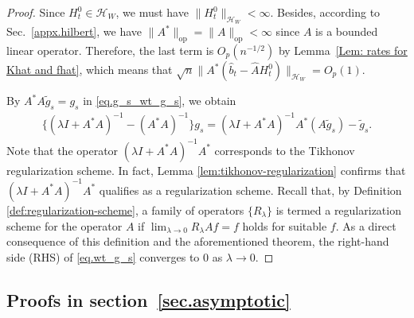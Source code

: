 \documentclass[
  12pt]{article}
\def\to{\rightarrow}
\def\wt{\widetilde}
\def\cH{\mathcal{H}}
\begin{document}
\begin{proof}
Since $H^0_t \in \cH_W$, we must have $\| H^0_t\|_{\cH_W} < \infty$. Besides, according to Sec.~\ref{appx.hilbert}, we have $\| A^*\|_{\mathrm{op}}=\| A\|_{\mathrm{op}} < \infty$ since $A$ is a bounded linear operator. Therefore, the last term is $O_{p}(n^{-1/2})$ by Lemma~\ref{Lem: rates for Khat and fhat}, which means that $\sqrt{n}\| A^*(\widehat{b}_t-\widehat{A}H^0_t)\|_{\mathcal{H}_W}=O_{p}(1)$. 


By $A^*A\wt{g}_s=g_s$ in \eqref{eq.g_s_wt_g_s}, we obtain
\begin{align}
\label{eq.wt_g_s}
    \{(\lambda I + A^* A)^{-1}-(A^*A)^{-1}\}g_s=(\lambda I + A^* A)^{-1}A^*(A\wt{g}_s)-\wt{g}_s.
\end{align}
Note that the operator $(\lambda I + A^*A)^{-1}A^*$ corresponds to the Tikhonov regularization scheme. In fact, Lemma \ref{lem:tikhonov-regularization} confirms that $(\lambda I + A^*A)^{-1}A^*$ qualifies as a regularization scheme. Recall that, by Definition \ref{def:regularization-scheme}, a family of operators $\{R_{\lambda}\}$ is termed a regularization scheme for the operator $A$ if $\lim_{\lambda\to 0} R_{\lambda}Af=f$ holds for suitable $f$. As a direct consequence of this definition and the aforementioned theorem, the right-hand side (RHS) of \eqref{eq.wt_g_s} converges to $0$ as $\lambda \to 0$.
\end{proof}










\subsection{Proofs in section~\ref{sec.asymptotic}}
\end{document}

